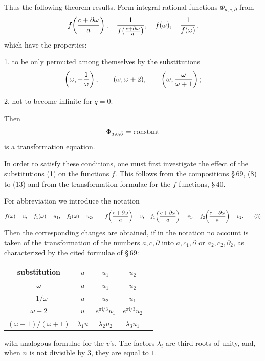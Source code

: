 \documentclass[11pt]{article}
\providecommand{\ii}{\mathrm{i}}
\begin{document}
Thus the following theorem results. Form integral rational functions $\Phi_{a,c,\partial}$ from
\[
 f\!\left({c+\partial\omega\over a}\right),\quad
 {1\over f\!\left({c+\partial\omega\over a}\right)},
 \quad f(\omega),\quad {1\over f(\omega)},
\]
which have the properties:

1. to be only permuted among themselves by the substitutions
\[
 \left(\omega,-{1\over\omega}\right),
 \qquad (\omega,\omega+2),
 \qquad \left(\omega,{\omega\over\omega+1}\right);
\]

2. not to become infinite for $q=0$.

Then
\[
 \Phi_{a,c,\partial}=\hbox{constant}
\]
is a transformation equation.

In order to satisfy these conditions, one must first investigate the effect of the substitutions (1) on the functions $f$. This follows from the compositions \S\,69, (8) to (13) and from the transformation formulae for the $f$-functions, \S\,40.

For abbreviation we introduce the notation
\begin{equation}
 f(\omega)=u,
 \quad f_1(\omega)=u_1,
 \quad f_2(\omega)=u_2,
 \qquad
 f\!\left({c+\partial\omega\over a}\right)=v,
 \quad f_1\!\left({c+\partial\omega\over a}\right)=v_1,
 \quad f_2\!\left({c+\partial\omega\over a}\right)=v_2.
\tag{3}
\end{equation}
Then the corresponding changes are obtained, if in the notation no account is taken of the transformation of the numbers $a,c,\partial$ into $a,c_1,\partial$ or $a_2,c_2,\partial_2$, as characterized by the cited formulae of \S\,69:
\begin{center}
\begin{tabular}{c|cccc}
substitution & $u$ & $u_1$ & $u_2$ \\
\hline
$\omega$ & $u$ & $u_1$ & $u_2$\\[0.2em]
$-1/\omega$ & $u$ & $u_2$ & $u_1$\\[0.2em]
$\omega+2$ & $u$ & $e^{\pi\ii/3}u_1$ & $e^{\pi\ii/3}u_2$\\[0.2em]
$(\omega-1)/(\omega+1)$ & $\lambda_1 u$ & $\lambda_2 u_2$ & $\lambda_3 u_1$
\end{tabular}
\end{center}
with analogous formulae for the $v$'s. The factors $\lambda_i$ are third roots of unity, and, when $n$ is not divisible by $3$, they are equal to $1$.
\end{document}

